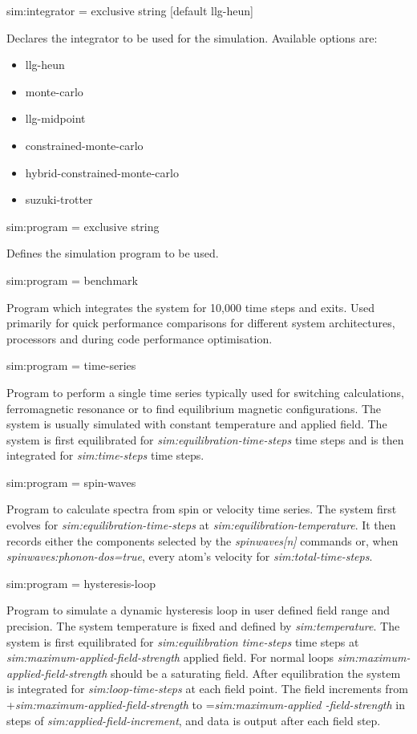 {\zicf sim:integrator = exclusive string [default llg-heun]} Declares the integrator to be used for the simulation. Available options are:
\begin{itemize}
  \item[] llg-heun
  \item[] monte-carlo
  \item[] llg-midpoint
  \item[] constrained-monte-carlo
  \item[] hybrid-constrained-monte-carlo
  \item[] suzuki-trotter
\end{itemize}

{\zicf sim:program = exclusive string} Defines the simulation program to be used.

{\zicf sim:program = benchmark} Program which integrates the system for 10,000 time steps and exits. Used primarily for quick performance comparisons for different system architectures, processors and during code performance optimisation.

{\zicf sim:program = time-series} Program to perform a single time series typically used for switching calculations, ferromagnetic resonance or to find equilibrium magnetic configurations. The system is usually simulated with constant temperature and applied field. The system is first equilibrated for \textit{sim:equilibration-time-steps} time steps and is then integrated for \textit{sim:time-steps} time steps.

{\zicf sim:program = spin-waves}
Program to calculate spectra from spin or velocity time series. The system first evolves for \textit{sim:equilibration-time-steps} at \textit{sim:equilibration-temperature}.
It then records either the components selected by the \textit{spinwaves[n]} commands or, when \textit{spinwaves:phonon-dos=true}, every atom's velocity for \textit{sim:total-time-steps}.

{\zicf sim:program = hysteresis-loop} Program to simulate a dynamic hysteresis loop in user defined field range and precision. The system temperature is fixed and defined by \textit{sim:temperature}. The system is first equilibrated for \textit{sim:equilibration time-steps} time steps at \textit{sim:maximum-applied-field-strength} applied field. For normal loops \textit{sim:maximum-applied-field-strength} should be a saturating field. After equilibration the system is integrated for \textit{sim:loop-time-steps} at each field point. The field increments from +\textit{sim:maximum-applied-field-strength} to =\textit{sim:maximum-applied -field-strength} in steps of \textit{sim:applied-field-increment}, and data is output after each field step.

